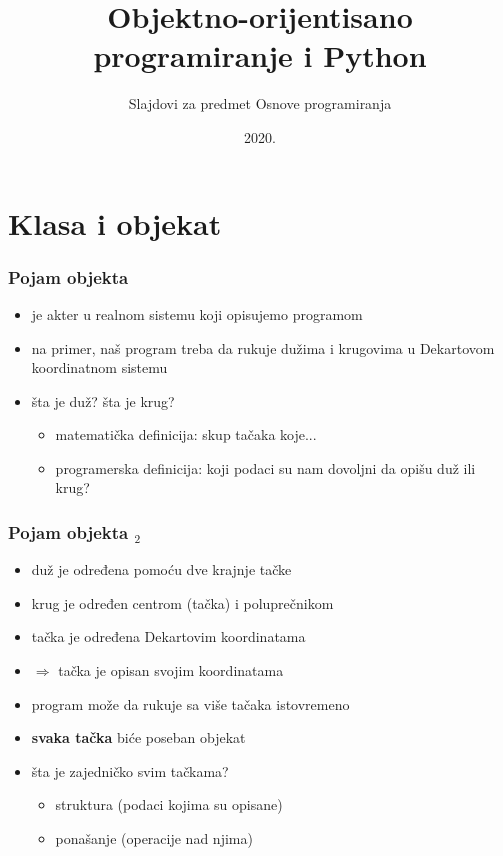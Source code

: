 \documentclass[utf8,compress,aspectratio=169]{beamer}
\title{Objektno-orijentisano programiranje i Python}
\subtitle{\tiny{Slajdovi za predmet Osnove programiranja}}
\institute{Katedra za informatiku, Fakultet tehničkih nauka, Novi Sad}
\date{2020.}
\begin{document}
\expandafter\def\csname PY@tok@err\endcsname{}

\frame{\titlepage}


\section[Klasa i objekat]{Klasa i objekat}

\begin{frame}[fragile]
  \frametitle{Pojam objekta}
  \begin{itemize}
    \item {} je akter u realnom sistemu koji opisujemo programom
    \item na primer, naš program treba da rukuje dužima i krugovima u Dekartovom koordinatnom sistemu
    \item šta je duž? šta je krug?
    \begin{itemize}
      \item matematička definicija: skup tačaka koje...
      \item programerska definicija: koji podaci su nam dovoljni da opišu duž ili krug?
    \end{itemize}
  \end{itemize}
\end{frame}

\begin{frame}[fragile]
  \frametitle{Pojam objekta $_2$}
  \begin{itemize}
    \item duž je određena pomoću dve krajnje tačke
    \item krug je određen centrom (tačka) i poluprečnikom
    \item tačka je određena Dekartovim koordinatama
    \item $\Rightarrow$ tačka je  opisan svojim koordinatama
    \item program može da rukuje sa više tačaka istovremeno
    \item \textbf{svaka tačka} biće poseban objekat
    \item šta je zajedničko svim tačkama?
    \begin{itemize}
      \item struktura (podaci kojima su opisane)
      \item ponašanje (operacije nad njima)
    \end{itemize}
  \end{itemize}
\end{frame}
\end{document}
